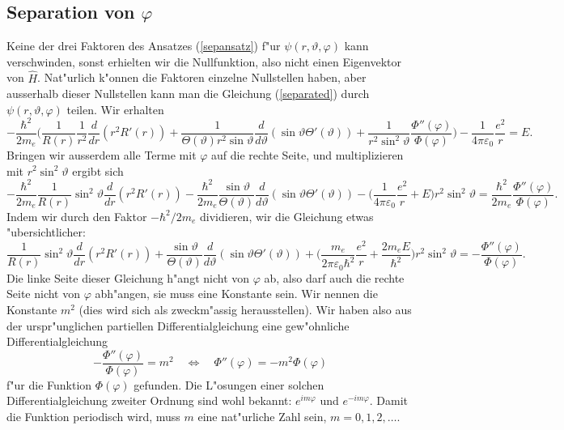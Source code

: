\subsection{Separation von $\varphi$}
Keine der drei Faktoren des Ansatzes (\ref{sepansatz}) f"ur
$\psi(r,\vartheta,\varphi)$ kann verschwinden, sonst erhielten wir die 
Nullfunktion, also nicht einen Eigenvektor von $\hat H$.
Nat"urlich k"onnen die Faktoren einzelne Nullstellen haben, aber ausserhalb
dieser Nullstellen kann man die Gleichung (\ref{separated}) durch 
$\psi(r,\vartheta,\varphi)$ teilen. Wir erhalten
\begin{equation*}
-\frac{\hbar^2}{2m_e}\biggl(
\frac{1}{R(r)}
\frac{1}{r^2}
\frac{d}{dr}(r^2R'(r))
+
\frac{1}{\Theta(\vartheta) r^2\sin\vartheta}\frac{d}{d\vartheta}(\sin\vartheta \Theta'(\vartheta))
+
\frac{1}{r^2\sin^2\vartheta}\frac{\Phi''(\varphi)}{\Phi(\varphi)}
\biggr)
-\frac1{4\pi\varepsilon_0}\frac{e^2}{r}
=
E.
\end{equation*}
Bringen wir ausserdem alle Terme mit $\varphi$ auf die rechte Seite,
und multiplizieren mit $r^2\sin^2\vartheta$
ergibt sich
\begin{equation*}
-\frac{\hbar^2}{2m_e}
\frac{1}{R(r)}\sin^2\vartheta \frac{d}{dr}(r^2R'(r))
-
\frac{\hbar^2}{2m_e}
\frac{\sin\vartheta}{\Theta(\vartheta) }\frac{d}{d\vartheta}(\sin\vartheta \Theta'(\vartheta))
-\biggl(\frac1{4\pi\varepsilon_0}\frac{e^2}{r}
+
E\biggr)r^2\sin^2\vartheta
=
\frac{\hbar^2}{2m_e}\frac{\Phi''(\varphi)}{\Phi(\varphi)}.
\end{equation*}
Indem wir durch den Faktor $-\hbar^2/2m_e$ dividieren, wir die Gleichung
etwas "ubersichtlicher:
\begin{equation}
\frac{1}{R(r)}\sin^2\vartheta \frac{d}{dr}(r^2R'(r))
+
\frac{\sin\vartheta}{\Theta(\vartheta) }\frac{d}{d\vartheta}(\sin\vartheta \Theta'(\vartheta))
+\biggl(\frac{m_e}{2\pi\varepsilon_0\hbar^2}\frac{e^2}{r}
+
\frac{2m_eE}{\hbar^2}\biggr)r^2\sin^2\vartheta
=
-\frac{\Phi''(\varphi)}{\Phi(\varphi)}.
\label{phisepariert}
\end{equation}
Die linke Seite dieser Gleichung h"angt nicht von $\varphi$ ab, also
darf auch die rechte Seite nicht von $\varphi$ abh"angen, sie muss
eine Konstante sein. Wir nennen die Konstante $m^2$ (dies wird sich
als zweckm"assig herausstellen). Wir haben also aus der urspr"unglichen
partiellen Differentialgleichung eine gew"ohnliche Differentialgleichung
\[
-\frac{\Phi''(\varphi)}{\Phi(\varphi)}=m^2
\quad\Leftrightarrow\quad
\Phi''(\varphi)=-m^2\Phi(\varphi)
\]
f"ur die Funktion $\Phi(\varphi)$ gefunden.
Die L"osungen einer solchen Differentialgleichung zweiter Ordnung sind
wohl bekannt: $e^{im\varphi}$ und $e^{-im\varphi}$. Damit die Funktion
periodisch wird, muss $m$ eine nat"urliche Zahl sein, $m=0,1,2,\dots$.

